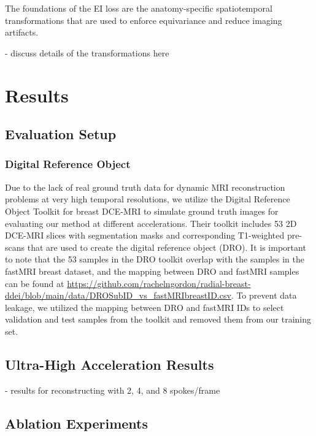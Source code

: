 \documentclass[runningheads]{llncs}
\begin{document}
The foundations of the EI loss are the anatomy-specific spatiotemporal transformations that are used to enforce equivariance and reduce imaging artifacts. 

- discuss details of the transformations here

\section{Results}

\subsection{Evaluation Setup}

\subsubsection{Digital Reference Object}


Due to the lack of real ground truth data for dynamic MRI reconstruction problems at very high temporal resolutions, we utilize the Digital Reference Object Toolkit for breast DCE-MRI \cite{Bae2024Digital} to simulate ground truth images for evaluating our method at different accelerations. Their toolkit includes 53 2D DCE-MRI slices with segmentation masks and corresponding T1-weighted pre-scans that are used to create the digital reference object (DRO). It is important to note that the 53 samples in the DRO toolkit overlap with the samples in the fastMRI breast dataset, and the mapping between DRO and fastMRI samples can be found at \url{https://github.com/rachelngordon/radial-breast-ddei/blob/main/data/DROSubID_vs_fastMRIbreastID.csv}. To prevent data leakage, we utilized the mapping between DRO and fastMRI IDs to select validation and test samples from the toolkit and removed them from our training set. 

\subsection{Ultra-High Acceleration Results}

- results for reconstructing with 2, 4, and 8 spokes/frame

\subsection{Ablation Experiments}
\end{document}

